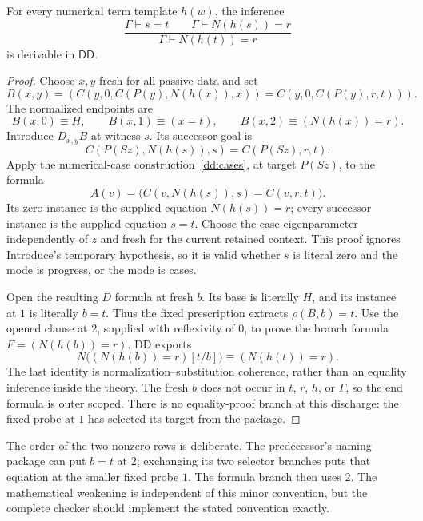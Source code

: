 \begin{theorem}
\label{dd:term-transport}
For every numerical term template $h(w)$, the inference
\[
 \frac{\Gamma\vdash s=t\qquad\Gamma\vdash N(h(s))=r}
      {\Gamma\vdash N(h(t))=r}
\]
is derivable in $\mathsf{DD}$.
\end{theorem}
\begin{proof}
Choose $x,y$ fresh for all passive data and set
\[
 B(x,y)=\left(
 C(y,0,C(P(y),N(h(x)),x))
 =C(y,0,C(P(y),r,t))\right).
 \tag{Package}\label{dd:package}
\]
The normalized endpoints are
\[
 B(x,0)\equiv H,\qquad
 B(x,1)\equiv(x=t),\qquad
 B(x,2)\equiv(N(h(x))=r).
\]
Introduce $D_{x,y}B$ at witness $s$.  Its successor goal is
\[
 C(P(Sz),N(h(s)),s)=C(P(Sz),r,t).
\]
Apply the numerical-case construction~\eqref{dd:cases}, at target $P(Sz)$,
to the formula
\[
 A(v)=\bigl(C(v,N(h(s)),s)=C(v,r,t)\bigr).
\]
Its zero instance is the supplied equation $N(h(s))=r$; every successor
instance is the supplied equation $s=t$.  Choose the case eigenparameter
independently of $z$ and fresh for the current retained context.  This proof
ignores Introduce's temporary hypothesis, so it is valid whether $s$ is
literal zero and the mode is progress, or the mode is cases.

Open the resulting $D$ formula at fresh $b$.  Its base is literally $H$,
and its instance at $1$ is literally $b=t$.  Thus the fixed prescription
extracts $\rho(B,b)=t$.  Use the opened clause at $2$, supplied with
reflexivity of $0$, to prove the branch formula
$F=(N(h(b))=r)$.  DD exports
\[
 N\bigl((N(h(b))=r)[t/b]\bigr)
       \equiv (N(h(t))=r).
\]
The last identity is normalization--substitution coherence, rather than
an equality inference inside the theory.  The fresh $b$ does not occur in
$t$, $r$, $h$, or $\Gamma$, so the end formula is outer scoped.  There is
no equality-proof branch at this discharge: the fixed probe at $1$ has
selected its target from the package.
\end{proof}

The order of the two nonzero rows is deliberate.  The predecessor's naming
package can put $b=t$ at $2$; exchanging its two selector branches puts that
equation at the smaller fixed probe $1$.  The formula branch then uses $2$.
The mathematical weakening is independent of this minor convention, but
the complete checker should implement the stated convention exactly.

